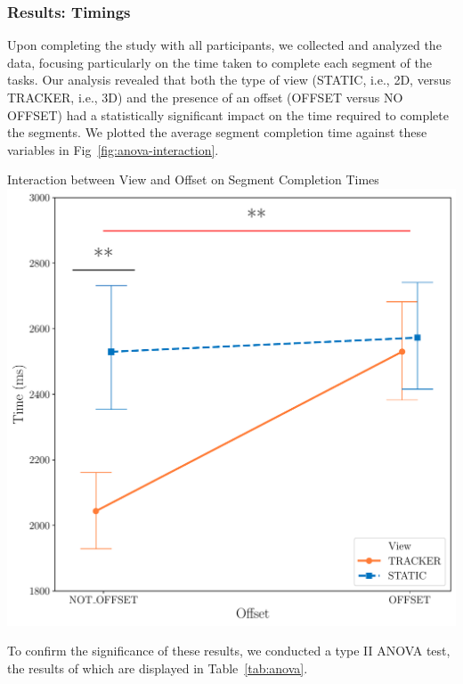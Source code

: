 \subsubsection{Results: Timings}
Upon completing the study with all participants, we collected and analyzed the data, focusing particularly on the time taken to complete each segment of the tasks. Our analysis revealed that both the type of view (STATIC, i.e., 2D, versus TRACKER, i.e., 3D) and the presence of an offset (OFFSET versus NO OFFSET) had a statistically significant impact on the time required to complete the segments. We plotted the average segment completion time against these variables in Fig~\ref{fig:anova-interaction}.

\begin{figureBox}[label={fig:anova-interaction}, width=0.8\linewidth]{Interaction between View and Offset on Segment Completion Times}
    \includegraphics[width = 1.0\linewidth]{./evaluation/figures/survery/anova-interaction.pdf}
\end{figureBox}

To confirm the significance of these results, we conducted a type II ANOVA test, the results of which are displayed in Table~\ref{tab:anova}. \\

